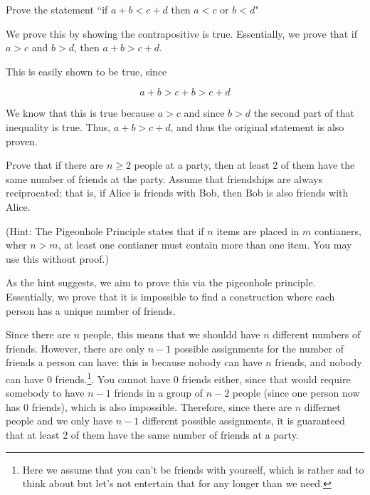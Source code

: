 \documentclass[11pt]{article}
\begin{document}
\maketitle
\fontsize{12}{15}\selectfont



Prove the statement ``if $a+b < c+d$ then $a < c$ or $b < d$"

\begin{solution}
    We prove this by showing the contrapositive is true. Essentially, we prove that if $a > c$ and $b >d$, then $a+b > c+d$. 

    This is easily shown to be true, since 

    \[ a +b > c + b > c+d\]

    We know that this is true because $a > c$ and since $b > d$ the second part of that inequality is true. Thus, $a + b > c+d$, and thus the original statement is also proven.
\end{solution}


Prove that if there are $n \ge 2$ people at a party, then at least 2 of them have the same number of friends at the party. Assume that friendships are always reciprocated: that is, if Alice is friends with Bob, then Bob is also friends with Alice. 

(Hint: The Pigeonhole Principle states that if $n$ items are placed in $m$ contianers, wher $n > m$, at least one contianer must contain more than one item. You may use this without proof.)

\begin{solution}
    As the hint suggests, we aim to prove this via the pigeonhole principle. Essentially, we prove that it is impossible to find a construction where each person has a unique number of friends. 

    Since there are $n$ people, this means that we shouldd have $n$ different numbers of friends. However, there are only $n - 1$ possible assignments for the number of friends a person can have: this is because nobody can have $n$ friends, and nobody can have $0$ friends.\footnote{Here we assume that you can't be friends with yourself, which is rather sad to think about but let's not entertain that for any longer than we need.}. You cannot have $0$ friends either, since that would require somebody to have $n-1$ friends in a group of $n - 2$ people (since one person now has $0$ friends), which is also impossible. Therefore, since there are $n$ differnet people and we only have $n-1$ different possible assignments, it is guaranteed that at least 2 of them have the same number of friends at a party. 
\end{solution}
\end{document}
